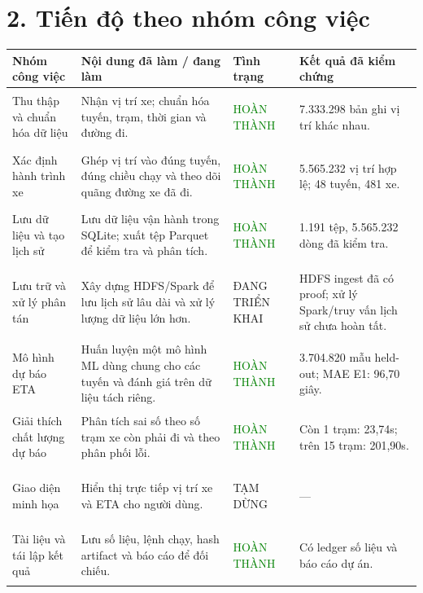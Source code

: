 \documentclass[10pt,a4paper]{article}
\newcommand{\done}{\colorbox{greenbox}{\scriptsize\textcolor{green}{\strut HOÀN THÀNH}}}
\newcommand{\doing}{\colorbox{amberbox}{\scriptsize\textcolor{amber}{\strut ĐANG TRIỂN KHAI}}}
\newcommand{\paused}{\colorbox{graybox}{\scriptsize\textcolor{black!65}{\strut TẠM DỪNG}}}
\begin{document}
\section*{2. Tiến độ theo nhóm công việc}
\footnotesize
{}
\begin{tabularx}{\textwidth}{P{2.65cm} P{3.55cm} P{2.02cm} Y}
\toprule
\textbf{Nhóm công việc} & \textbf{Nội dung đã làm / đang làm} & \textbf{Tình trạng} & \textbf{Kết quả đã kiểm chứng} \\
\midrule
Thu thập và chuẩn hóa dữ liệu & Nhận vị trí xe; chuẩn hóa tuyến, trạm, thời gian và đường đi. & \done & 7.333.298 bản ghi vị trí khác nhau. \\
Xác định hành trình xe & Ghép vị trí vào đúng tuyến, đúng chiều chạy và theo dõi quãng đường xe đã đi. & \done & 5.565.232 vị trí hợp lệ; 48 tuyến, 481 xe. \\
Lưu dữ liệu và tạo lịch sử & Lưu dữ liệu vận hành trong SQLite; xuất tệp Parquet để kiểm tra và phân tích. & \done & 1.191 tệp, 5.565.232 dòng đã kiểm tra. \\
Lưu trữ và xử lý phân tán & Xây dựng HDFS/Spark để lưu lịch sử lâu dài và xử lý lượng dữ liệu lớn hơn. & \doing & HDFS ingest đã có proof; xử lý Spark/truy vấn lịch sử chưa hoàn tất. \\
Mô hình dự báo ETA & Huấn luyện một mô hình ML dùng chung cho các tuyến và đánh giá trên dữ liệu tách riêng. & \done & 3.704.820 mẫu held-out; MAE E1: 96,70 giây. \\
Giải thích chất lượng dự báo & Phân tích sai số theo số trạm xe còn phải đi và theo phân phối lỗi. & \done & Còn 1 trạm: 23,74s; trên 15 trạm: 201,90s. \\
Giao diện minh họa & Hiển thị trực tiếp vị trí xe và ETA cho người dùng. & \paused & --- \\
Tài liệu và tái lập kết quả & Lưu số liệu, lệnh chạy, hash artifact và báo cáo để đối chiếu. & \done & Có ledger số liệu và báo cáo dự án. \\
\bottomrule
\end{tabularx}
\end{document}
